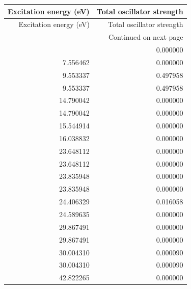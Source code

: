 \begin{longtable}{rr}
\toprule
Excitation energy (eV) & Total oscillator strength \\
\midrule
\endfirsthead
\toprule
Excitation energy (eV) & Total oscillator strength \\
\midrule
\endhead
\midrule
\multicolumn{2}{r}{Continued on next page} \\
\midrule
\endfoot
\bottomrule
\endlastfoot
7.556462 & 0.000000 \\
7.556462 & 0.000000 \\
9.553337 & 0.497958 \\
9.553337 & 0.497958 \\
14.790042 & 0.000000 \\
14.790042 & 0.000000 \\
15.544914 & 0.000000 \\
16.038832 & 0.000000 \\
23.648112 & 0.000000 \\
23.648112 & 0.000000 \\
23.835948 & 0.000000 \\
23.835948 & 0.000000 \\
24.406329 & 0.016058 \\
24.589635 & 0.000000 \\
29.867491 & 0.000000 \\
29.867491 & 0.000000 \\
30.004310 & 0.000090 \\
30.004310 & 0.000090 \\
42.822265 & 0.000000 \\
\end{longtable}
